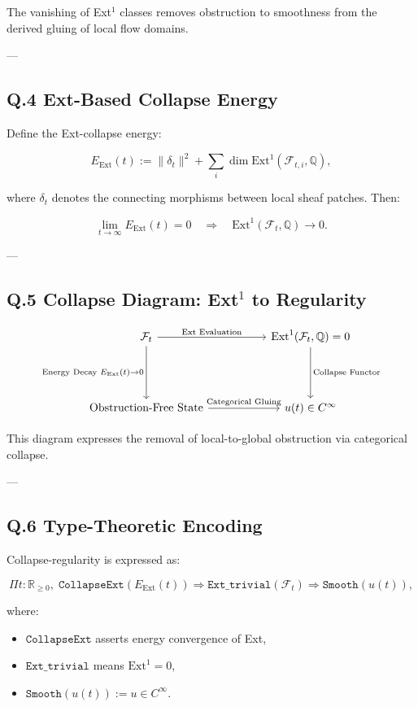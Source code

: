 \documentclass[11pt]{article}
\begin{document}
The vanishing of Ext$^1$ classes removes obstruction to smoothness from the derived gluing of local flow domains.

---

\subsection*{Q.4 Ext-Based Collapse Energy}

Define the Ext-collapse energy:

\[
E_{\mathrm{Ext}}(t) := \|\delta_t\|^2 + \sum_i \dim \mathrm{Ext}^1(\mathcal{F}_{t,i}, \mathbb{Q}),
\]

where $\delta_t$ denotes the connecting morphisms between local sheaf patches. Then:

\[
\lim_{t \to \infty} E_{\mathrm{Ext}}(t) = 0
\quad \Rightarrow \quad
\mathrm{Ext}^1(\mathcal{F}_t, \mathbb{Q}) \to 0.
\]

---

\subsection*{Q.5 Collapse Diagram: Ext$^1$ to Regularity}

\[
\begin{tikzcd}[column sep=1.8cm, row sep=1.6cm]
\mathcal{F}_t \arrow[r, "\text{Ext Evaluation}"] \arrow[d, "\text{Energy Decay } E_{\mathrm{Ext}}(t) \to 0"']
& \mathrm{Ext}^1(\mathcal{F}_t, \mathbb{Q}) = 0 \arrow[d, "\text{Collapse Functor}"] \\
\text{Obstruction-Free State} \arrow[r, "\text{Categorical Gluing}"]
& u(t) \in C^\infty
\end{tikzcd}
\]

This diagram expresses the removal of local-to-global obstruction via categorical collapse.

---

\subsection*{Q.6 Type-Theoretic Encoding}

Collapse-regularity is expressed as:

\[
\Pi t : \mathbb{R}_{\ge 0},\;
\texttt{CollapseExt}(E_{\mathrm{Ext}}(t)) \Rightarrow
\texttt{Ext\_trivial}(\mathcal{F}_t)
\Rightarrow \texttt{Smooth}(u(t)),
\]

where:
\begin{itemize}
  \item $\texttt{CollapseExt}$ asserts energy convergence of Ext,
  \item $\texttt{Ext\_trivial}$ means $\mathrm{Ext}^1 = 0$,
  \item $\texttt{Smooth}(u(t)) := u \in C^\infty$.
\end{itemize}
\end{document}
